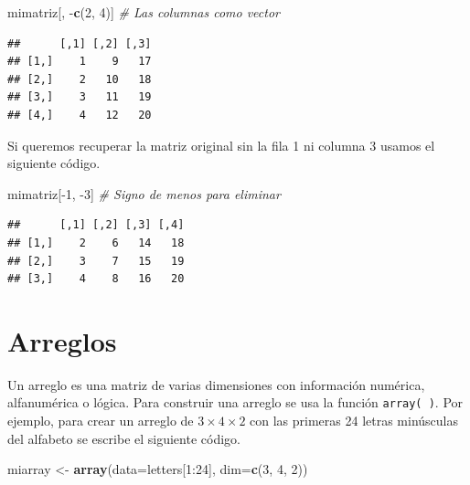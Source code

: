 \documentclass[10pt,]{krantz}
\makeatletter
\newenvironment{Shaded}{\begin{snugshade}}{\end{snugshade}}
\newcommand{\KeywordTok}[1]{\textcolor[rgb]{0.13,0.29,0.53}{\textbf{{#1}}}}
\newcommand{\DataTypeTok}[1]{\textcolor[rgb]{0.13,0.29,0.53}{{#1}}}
\newcommand{\DecValTok}[1]{\textcolor[rgb]{0.00,0.00,0.81}{{#1}}}
\newcommand{\StringTok}[1]{\textcolor[rgb]{0.31,0.60,0.02}{{#1}}}
\newcommand{\CommentTok}[1]{\textcolor[rgb]{0.56,0.35,0.01}{\textit{{#1}}}}
\newcommand{\NormalTok}[1]{{#1}}
\newenvironment{kframe}{%
\medskip{}
\setlength{\fboxsep}{.8em}
 \def\at@end@of@kframe{}%
 \ifinner\ifhmode%
  \def\at@end@of@kframe{\end{minipage}}%
  \begin{minipage}{\columnwidth}%
 \fi\fi%
 \def\FrameCommand##1{\hskip\@totalleftmargin \hskip-\fboxsep
 \colorbox{shadecolor}{##1}\hskip-\fboxsep
     \hskip-\linewidth \hskip-\@totalleftmargin \hskip\columnwidth}%
 \MakeFramed {\advance\hsize-\width
   \@totalleftmargin\z@ \linewidth\hsize
   \@setminipage}}%
 {\par\unskip\endMakeFramed%
 \at@end@of@kframe}
\renewenvironment{Shaded}{\begin{kframe}}{\end{kframe}}
\makeatother
\begin{document}
\begin{Shaded}
\begin{Highlighting}[]
\NormalTok{mimatriz[, -}\KeywordTok{c}\NormalTok{(}\DecValTok{2}\NormalTok{, }\DecValTok{4}\NormalTok{)]  }\CommentTok{# Las columnas como vector}
\end{Highlighting}
\end{Shaded}

\begin{verbatim}
##      [,1] [,2] [,3]
## [1,]    1    9   17
## [2,]    2   10   18
## [3,]    3   11   19
## [4,]    4   12   20
\end{verbatim}

Si queremos recuperar la matriz original sin la fila 1 ni columna 3
usamos el siguiente código.

\begin{Shaded}
\begin{Highlighting}[]
\NormalTok{mimatriz[-}\DecValTok{1}\NormalTok{, -}\DecValTok{3}\NormalTok{]  }\CommentTok{# Signo de menos para eliminar}
\end{Highlighting}
\end{Shaded}

\begin{verbatim}
##      [,1] [,2] [,3] [,4]
## [1,]    2    6   14   18
## [2,]    3    7   15   19
## [3,]    4    8   16   20
\end{verbatim}

\section{\texorpdfstring{Arreglos 
}{Arreglos  }}\label{arreglos}

Un arreglo es una matriz de varias dimensiones con información numérica,
alfanumérica o lógica. Para construir una arreglo se usa la función
\texttt{array(\ )}. Por ejemplo, para crear un arreglo de
\(3 \times 4 \times 2\) con las primeras 24 letras minúsculas del
alfabeto se escribe el siguiente código.

\begin{Shaded}
\begin{Highlighting}[]
\NormalTok{miarray <-}\StringTok{ }\KeywordTok{array}\NormalTok{(}\DataTypeTok{data=}\NormalTok{letters[}\DecValTok{1}\NormalTok{:}\DecValTok{24}\NormalTok{], }\DataTypeTok{dim=}\KeywordTok{c}\NormalTok{(}\DecValTok{3}\NormalTok{, }\DecValTok{4}\NormalTok{, }\DecValTok{2}\NormalTok{))}
\end{Highlighting}
\end{Shaded}
\end{document}
